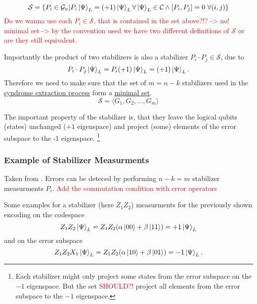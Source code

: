 \begin{equation}
    \mathcal{S} = \{ P_i \in \mathcal{G}_n | P_i \ket{\Psi}_L = (+1) \ket{\Psi}_L \forall \ket{\Psi}_L\in \mathcal{C} \land [P_i,P_j]=0 \ \forall(i,j)\}
\end{equation}
\textcolor{red}{Do we wanna use each $P_i \in \mathcal{S}$, that is contained in the set above?!? -> no! minimal set -> by the convention used we have two different definitions of $\mathcal{S}$ or are they still equivalent.}

Importantly the product of two stabilizers is also a stabilizer $P_i \cdot P_j \in \mathcal{S}$, due to
\begin{equation}
    P_i \cdot P_j  \ket{\Psi}_L = P_i (+1) \ket{\Psi}_L = (+1) \ket{\Psi}_L.
\end{equation}
Therefore we need to make sure that the set of $m=n-k$ stabilizers used in the \hyperref[sec:basic.qc.syndrome_extraction_process]{syndrome extraction process}
form a \hyperref[sec:basic.math.minimal_set]{minimal set}. 
\begin{equation}
    \mathcal{S}= \langle G_1, G_2, ..., G_m\rangle
\end{equation}

The important property of the stabilizer is, that they leave the logical qubits (states) unchanged ($+1$ eigenspace) 
and project (some) elements of the error subspace to the -1 eigenspace.
\footnote{
    Each stabilizer might only project some states from the error subspace on the $-1$ eigenspace. 
    But the set \textcolor{red}{SHOULD?!} project all elements from the error subspace to the $-1$ eigenspace. 
} \cite{QECintro}


\subsubsection{Example of Stabilizer Measurments}
Taken from \cite{QECintro}.
Errors can be deteced by performing $n-k=m$ stabilizer measurments $P_i$.
\textcolor{red}{Add the commutation condition with error operators}

Some examples for a stabilizer (here $Z_1 Z_2$) measurments for the previously shown encoding on the codespace
\begin{equation}
    Z_1 Z_2 \ket{\Psi}_L = Z_1 Z_2 (\alpha \ket{00}+ \beta \ket{11}) = +1 \ket{\Psi}_L
\end{equation}
and on the error subspace
\begin{equation}
    Z_1 Z_2 X_1\ket{\Psi}_L = Z_1 Z_2 (\alpha \ket{10}+ \beta \ket{01}) = -1 \ket{\Psi}_L.
\end{equation}

